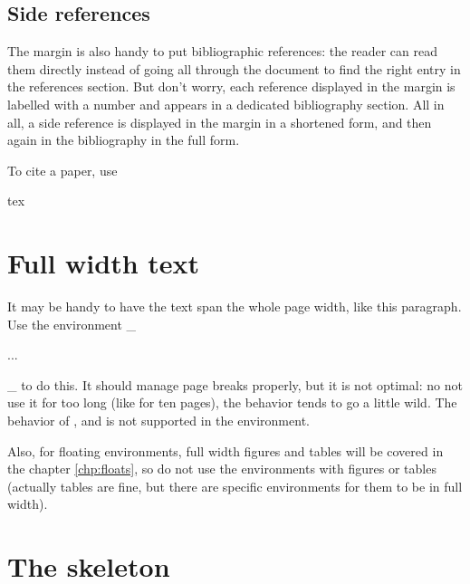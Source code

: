 \subsection{Side references}

The margin is also handy to put bibliographic references: the reader can read them directly instead of going all through the document to find the right entry in the references section. But don't worry, each reference displayed in the margin is labelled with a number and appears in a dedicated bibliography section. All in all, a side reference is displayed in the margin in a shortened form, and then again in the bibliography in the full form.

To cite a paper, use
\begin{codebox}{tex}
\end{codebox}


\section{Full width text}

\begin{wide}
	It may be handy to have the text span the whole page width, like this paragraph. Use the environment _\begin{wide}...\end{wide}_ to do this. It should manage page breaks properly, but it is not optimal: no not use it for too long (like for ten pages), the behavior tends to go a little wild. The behavior of ,  and  is not supported in the  environment.

	Also, for floating environments, full width figures and tables will be covered in the chapter \ref{chp:floats}, so do not use the  environments with figures or tables (actually tables are fine, but there are specific environments for them to be in full width).
\end{wide}

\section{The skeleton}

